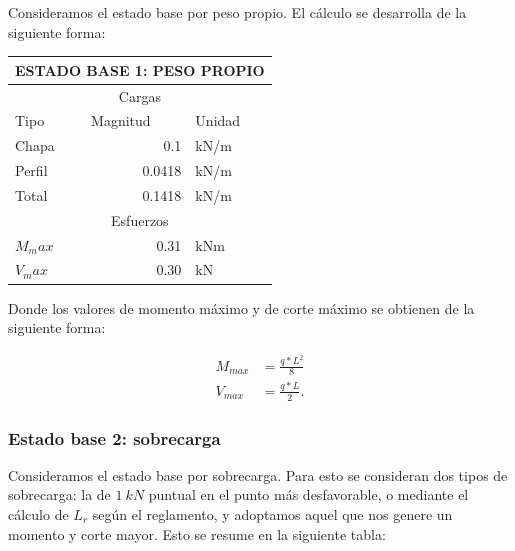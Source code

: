 \documentclass[../main.tex]{subfiles}
\begin{document}
Consideramos el estado base por peso propio. El cálculo se desarrolla de la
siguiente forma:

\begin{table}[htbp]
  \centering
    \begin{tabular}{|l|r|l|}
    \hline
    \multicolumn{3}{|c|}{\textbf{ESTADO BASE 1: PESO PROPIO}} \bigstrut\\
    \hline
    \multicolumn{3}{|c|}{Cargas} \bigstrut\\
    \hline
    Tipo  & \multicolumn{1}{l|}{Magnitud} & Unidad \bigstrut\\
    \hline
    Chapa & 0.1   & kN/m \bigstrut\\
    \hline
    Perfil & 0.0418 & kN/m \bigstrut\\
    \hline
    Total & 0.1418 & kN/m \bigstrut\\
    \hline
    \multicolumn{3}{|c|}{Esfuerzos} \bigstrut\\
    \hline
    $M_max$  & 0.31  & kNm \bigstrut\\
    \hline
    $V_max$  & 0.30  & kN \bigstrut\\
    \hline
    \end{tabular}%
\end{table}%

Donde los valores de momento máximo y de corte máximo se obtienen de la siguiente
forma:

\begin{align*}
  M_{max} &= \frac{q*L^2}{8} \\[5pt]
  V_{max} &= \frac{q*L}{2}
.\end{align*}

\subsubsection{Estado base 2: sobrecarga}

Consideramos el estado base por sobrecarga. Para esto se consideran dos tipos
de sobrecarga: la de $\SI{1}{kN}$ puntual en el punto más desfavorable, o mediante
el cálculo de $L_r$ según el reglamento, y adoptamos aquel que nos genere un
momento y corte mayor. Esto se resume en la siguiente tabla:
\end{document}
